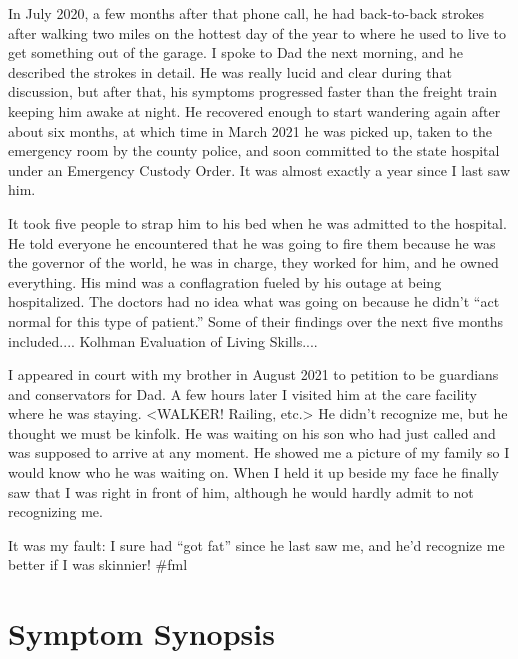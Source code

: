 \documentclass{article}
\begin{document}
In July 2020, a few months after that phone call, he had back-to-back strokes after walking two miles on the hottest day of the year to where he used to live to get something out of the garage. I spoke to Dad the next morning, and he described the strokes in detail. He was really lucid and clear during that discussion, but after that, his symptoms progressed faster than the freight train keeping him awake at night. He recovered enough to start wandering again after about six months, at which time in March 2021 he was picked up, taken to the emergency room by the county police, and soon committed to the state hospital under an Emergency Custody Order. It was almost exactly a year since I last saw him. 

It took five people to strap him to his bed when he was admitted to the hospital. He told everyone he encountered that he was going to fire them because he was the governor of the world, he was in charge, they worked for him, and he owned everything. His mind was a conflagration fueled by his outage at being hospitalized. The doctors had no idea what was going on because he didn't ``act normal for this type of patient.'' Some of their findings over the next five months included.... Kolhman Evaluation of Living Skills....

I appeared in court with my brother in August 2021 to petition to be guardians and conservators for Dad. A few hours later I visited him at the care facility where he was staying. <WALKER! Railing, etc.> He didn't recognize me, but he thought we must be kinfolk. He was waiting on his son who had just called and was supposed to arrive at any moment. He showed me a picture of my family so I would know who he was waiting on. When I held it up beside my face he finally saw that I was right in front of him, although he would hardly admit to not recognizing me. 

It was my fault: I sure had ``got fat'' since he last saw me, and he'd recognize me better if I was skinnier! \#fml

\section*{Symptom Synopsis}
\end{document}

